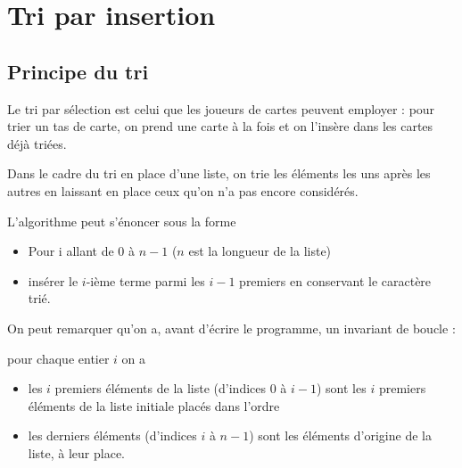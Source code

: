 \section{Tri par insertion}
\subsection{Principe du tri}
Le tri par sélection est celui que les joueurs de cartes peuvent employer : pour trier un tas de carte, on prend une carte à la fois et on l'insère dans les cartes déjà triées.

Dans le cadre du tri en place d'une liste, on trie les éléments les uns après les autres en laissant en place ceux qu'on n'a pas encore considérés.

L'algorithme peut s'énoncer sous la forme
\begin{itemize}
\item Pour i allant de 0 à $n-1$ ($n$ est la longueur de la liste)
\item insérer le $i$-ième terme parmi les $i-1$ premiers en conservant le caractère trié.
\end{itemize}
On peut remarquer qu'on a, avant d'écrire le programme, un invariant de boucle :

pour chaque entier $i$ on a
\begin{itemize}
\item les $i$ premiers éléments de la liste (d'indices 0 à $i-1$) sont les $i$ premiers éléments de la liste initiale placés dans l'ordre
\item les derniers éléments (d'indices $i$ à $n-1$) sont les éléments d'origine de la liste, à leur place.
\end{itemize}

